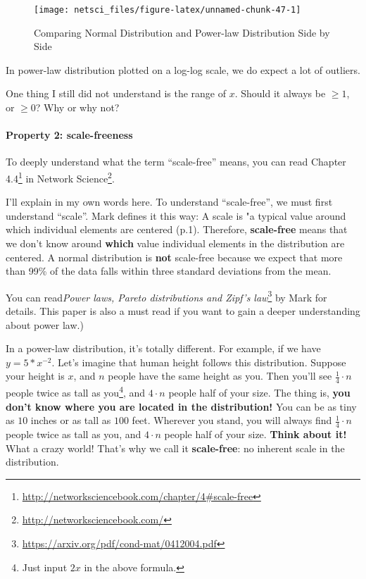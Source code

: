 \documentclass[
]{krantz}
\makeatletter
\renewcommand{\href}[2]{#2\footnote{\url{#1}}}
\newenvironment{kframe}{%
\medskip{}
\setlength{\fboxsep}{.8em}
 \def\at@end@of@kframe{}%
 \ifinner\ifhmode%
  \def\at@end@of@kframe{\end{minipage}}%
  \begin{minipage}{\columnwidth}%
 \fi\fi%
 \def\FrameCommand##1{\hskip\@totalleftmargin \hskip-\fboxsep
 \colorbox{shadecolor}{##1}\hskip-\fboxsep
     \hskip-\linewidth \hskip-\@totalleftmargin \hskip\columnwidth}%
 \MakeFramed {\advance\hsize-\width
   \@totalleftmargin\z@ \linewidth\hsize
   \@setminipage}}%
 {\par\unskip\endMakeFramed%
 \at@end@of@kframe}
\newenvironment{rmdblock}[1]
  {
  \begin{itemize}
  \renewcommand{\labelitemi}{
    \raisebox{-.7\height}[0pt][0pt]{
      {\setkeys{Gin}{width=3em,keepaspectratio}\texttt{[image: images/\#1]}}
    }
  }
  \setlength{\fboxsep}{1em}
  \begin{kframe}
  \item
  }
  {
  \end{kframe}
  \end{itemize}
  }
\newenvironment{rmdreminder}
  {\begin{rmdblock}{reminder}}
  {\end{rmdblock}}
\makeatother
\begin{document}
\begin{figure}

{\centering \texttt{[image: netsci\_files/figure-latex/unnamed-chunk-47-1]} 

}

\caption{Comparing Normal Distribution and Power-law Distribution Side by Side}\label{fig:unnamed-chunk-47}
\end{figure}

In power-law distribution plotted on a log-log scale, we do expect a lot of outliers.

\begin{rmdreminder}
One thing I still did not understand is the range of \(x\). Should it always be \(\ge 1\), or \(\ge 0\)? Why or why not?
\end{rmdreminder}

\hypertarget{property-2-scale-freeness}{%
\paragraph{Property 2: scale-freeness}\label{property-2-scale-freeness}}

To deeply understand what the term ``scale-free'' means, you can read \href{http://networksciencebook.com/chapter/4\#scale-free}{Chapter 4.4} in \href{http://networksciencebook.com/}{Network Science}.

I'll explain in my own words here. To understand ``scale-free'', we must first understand ``scale''. Mark \citet{newman2005power} defines it this way: A scale is "a typical value around which individual elements are centered (p.1). Therefore, \textbf{scale-free} means that we don't know around \textbf{which} value individual elements in the distribution are centered. A normal distribution is \textbf{not} scale-free because we expect that more than 99\% of the data falls within three standard deviations from the mean.

You can read\href{https://arxiv.org/pdf/cond-mat/0412004.pdf}{\emph{Power laws, Pareto distributions and Zipf's law}} by Mark \citet{newman2005power} for details. This paper is also a must read if you want to gain a deeper understanding about power law.)

In a power-law distribution, it's totally different. For example, if we have \(y = 5*x^{-2}\). Let's imagine that human height follows this distribution. Suppose your height is \(x\), and \(n\) people have the same height as you. Then you'll see \(\frac{1}{4} \cdot n\) people twice as tall as you\footnote{Just input \(2x\) in the above formula.}, and \(4 \cdot n\) people half of your size. The thing is, \textbf{you don't know where you are located in the distribution!} You can be as tiny as \(10\) inches or as tall as \(100\) feet. Wherever you stand, you will always find \(\frac{1}{4} \cdot n\) people twice as tall as you, and \(4 \cdot n\) people half of your size. \textbf{Think about it!} What a crazy world! That's why we call it \textbf{scale-free}: no inherent scale in the distribution.
\end{document}
